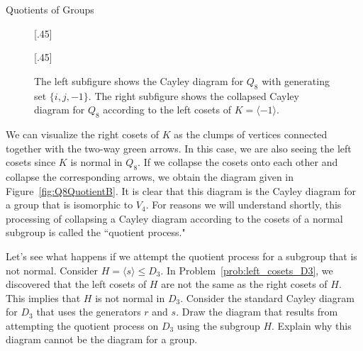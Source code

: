 \begin{section}{Quotients of Groups}
\begin{figure}[!ht]
\centering
\subcaptionbox{\label{fig:Q8QuotientA}}[.45\textwidth]{
}
\subcaptionbox{\label{fig:Q8QuotientB}}[.45\textwidth]{
}
\caption{The left subfigure shows the Cayley diagram for $Q_8$ with generating set $\{i,j,-1\}$. The right subfigure shows the collapsed Cayley diagram for $Q_8$ according to the left cosets of $K=\langle -1\rangle$.}
\label{fig:Q8Repeat}
\end{figure}

We can visualize the right cosets of $K$ as the clumps of vertices connected together with the two-way green arrows.  In this case, we are also seeing the left cosets since $K$ is normal in $Q_8$.  If we collapse the cosets onto each other and collapse the corresponding arrows, we obtain the diagram given in Figure~\ref{fig:Q8QuotientB}. It is clear that this diagram is the Cayley diagram for a group that is isomorphic to $V_4$.  For reasons we will understand shortly, this processing of collapsing a Cayley diagram according to the cosets of a normal subgroup is called the ``quotient process."

\begin{problem}\label{prob:bad_quotient}
Let's see what happens if we attempt the quotient process for a subgroup that is not normal.  Consider $H=\langle s\rangle \leq D_3$.  In Problem~\ref{prob:left_cosets_D3}, we discovered that the left cosets of $H$ are not the same as the right cosets of $H$.  This implies that $H$ is not normal in $D_3$.  Consider the standard Cayley diagram for $D_3$ that uses the generators $r$ and $s$.  Draw the diagram that results from attempting the quotient process on $D_3$ using the subgroup $H$.  Explain why this diagram cannot be the diagram for a group.
\end{problem}


\end{section}
